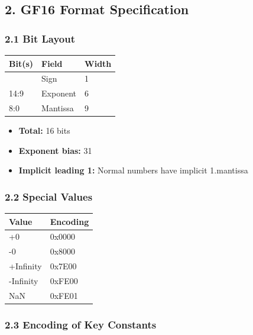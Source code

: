 \documentclass[
]{article}
\newcounter{none} %
\providecommand{\tightlist}{%
  \setlength{\itemsep}{0pt}\setlength{\parskip}{0pt}}
\begin{document}
\subsection{2. GF16 Format
Specification}\label{gf16-format-specification}

\subsubsection{2.1 Bit Layout}\label{bit-layout}

{\def\LTcaptype{none} %
\begin{longtable}[]{@{}lll@{}}
\toprule\noalign{}
Bit(s) & Field & Width \\
\midrule\noalign{}
\endhead
\bottomrule\noalign{}
\endlastfoot
15 & Sign & 1 \\
14:9 & Exponent & 6 \\
8:0 & Mantissa & 9 \\
\end{longtable}
}

\begin{itemize}
\tightlist
\item
  \textbf{Total:} 16 bits
\item
  \textbf{Exponent bias:} 31
\item
  \textbf{Implicit leading 1:} Normal numbers have implicit 1.mantissa
\end{itemize}

\subsubsection{2.2 Special Values}\label{special-values}

{\def\LTcaptype{none} %
\begin{longtable}[]{@{}ll@{}}
\toprule\noalign{}
Value & Encoding \\
\midrule\noalign{}
\endhead
\bottomrule\noalign{}
\endlastfoot
+0 & 0x0000 \\
-0 & 0x8000 \\
+Infinity & 0x7E00 \\
-Infinity & 0xFE00 \\
NaN & 0xFE01 \\
\end{longtable}
}

\subsubsection{2.3 Encoding of Key
Constants}\label{encoding-of-key-constants}
\end{document}
